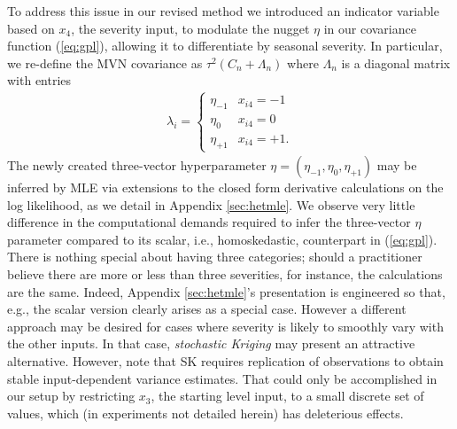 \documentclass[12pt]{article}
\begin{document}
To address this issue in our revised method we introduced an indicator
variable based on $x_4$, the severity input, to modulate the nugget $\eta$ in
our covariance function (\ref{eq:gpl}), allowing it to differentiate by
seasonal severity.  In particular, we re-define the MVN covariance as $\tau^2
(C_n + \Lambda_n)$ where $\Lambda_n$ is a diagonal matrix with entries
\begin{align}
\lambda_i = \left\{ \begin{array}{cl}
\eta_{-1} & x_{i4} = -1 \\
\eta_0 & x_{i4} = 0 \\
\eta_{+1} & x_{i4} = +1.
\end{array}
  \right.
\label{eq:hetnug}
\end{align}
The newly created three-vector hyperparameter $\eta = (\eta_{-1}, \eta_0,
\eta_{+1})$ may be inferred by MLE via
extensions to the closed form derivative calculations on the log likelihood,
as we detail in Appendix \ref{sec:hetmle}.  We observe very little difference
in the computational demands required to infer the three-vector $\eta$
parameter compared to its scalar, i.e., homoskedastic, counterpart in
(\ref{eq:gpl}). There is nothing special about having three categories; should
a practitioner believe there are more or less than three severities, for
instance, the calculations are the same. Indeed, Appendix \ref{sec:hetmle}'s
presentation is engineered so that, e.g., the scalar version clearly arises as
a special case.  However a different approach may be desired for cases where
severity is likely to smoothly vary with the other inputs.  In that case, {\em
stochastic Kriging} \citep[SK,][]{ankennman:nelson:staum:2010} may present an
attractive alternative.  However, note that SK requires replication of
observations to obtain stable input-dependent variance estimates. That could
only be accomplished in our setup by restricting $x_3$, the starting level
input, to a small discrete set of values, which (in experiments not detailed
herein) has deleterious effects.

\end{document}
